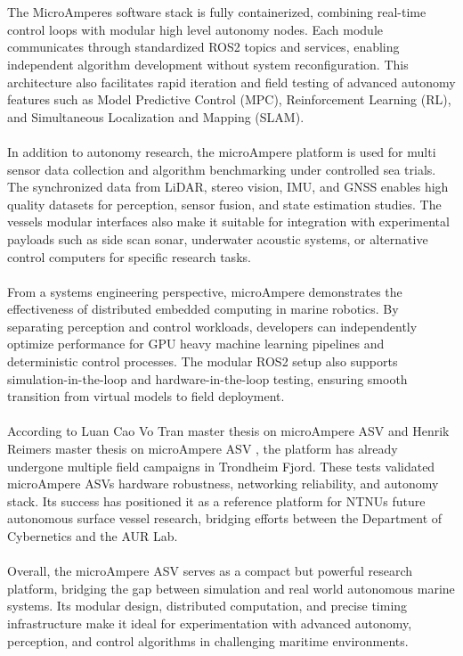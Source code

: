 \\ \\
The MicroAmperes software stack is fully containerized, combining real-time control loops with modular high level autonomy nodes. Each module communicates through standardized ROS2 topics and services, enabling independent algorithm development without system reconfiguration. This architecture also facilitates rapid iteration and field testing of advanced autonomy features such as Model Predictive Control (MPC), Reinforcement Learning (RL), and Simultaneous Localization and Mapping (SLAM).
\\ \\
In addition to autonomy research, the microAmpere platform is used for multi sensor data collection and algorithm benchmarking under controlled sea trials. The synchronized data from LiDAR, stereo vision, IMU, and GNSS enables high quality datasets for perception, sensor fusion, and state estimation studies. The vessels modular interfaces also make it suitable for integration with experimental payloads such as side scan sonar, underwater acoustic systems, or alternative control computers for specific research tasks.
\\ \\
From a systems engineering perspective, microAmpere demonstrates the effectiveness of distributed embedded computing in marine robotics. By separating perception and control workloads, developers can independently optimize performance for GPU heavy machine learning pipelines and deterministic control processes. The modular ROS2 setup also supports simulation-in-the-loop and hardware-in-the-loop testing, ensuring smooth transition from virtual models to field deployment.
\\ \\
According to Luan Cao Vo Tran master thesis on microAmpere ASV \cite{microAmpere_hardware_master_thesis1} and Henrik Reimers master thesis on microAmpere ASV \cite{microAmpere_hardware_master_thesis2}, the platform has already undergone multiple field campaigns in Trondheim Fjord. These tests validated microAmpere ASVs hardware robustness, networking reliability, and autonomy stack. Its success has positioned it as a reference platform for NTNUs future autonomous surface vessel research, bridging efforts between the Department of Cybernetics and the AUR Lab. 
\\ \\
Overall, the microAmpere ASV serves as a compact but powerful research platform, bridging the gap between simulation and real world autonomous marine systems. Its modular design, distributed computation, and precise timing infrastructure make it ideal for experimentation with advanced autonomy, perception, and control algorithms in challenging maritime environments.
